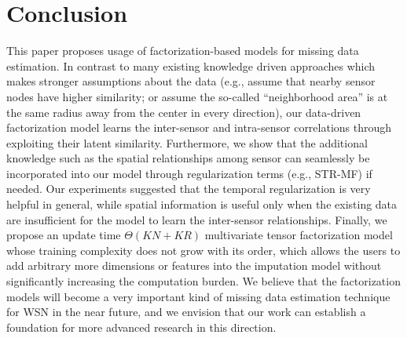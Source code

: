 \section{Conclusion}  \label{sec:conc}
This paper proposes usage of factorization-based models for missing data estimation.
In contrast to many existing knowledge driven approaches which makes stronger assumptions about the data (e.g., assume that nearby sensor nodes have higher similarity; or assume the so-called ``neighborhood area'' is at the same radius away from the center in every direction), our data-driven factorization model learns the inter-sensor and intra-sensor correlations through exploiting their latent similarity.
Furthermore, we show that the additional knowledge such as the spatial relationships among sensor can seamlessly be incorporated into our model through regularization terms (e.g., STR-MF) if needed.
Our experiments suggested that the temporal regularization is very helpful in general, while spatial information is useful only when the existing data are insufficient for the model to learn the inter-sensor relationships.
Finally, we propose an update time $\Theta(KN + KR)$ multivariate tensor factorization model whose training complexity does not grow with its order, which allows the users to add arbitrary more dimensions or features into the imputation model without significantly increasing the computation burden.
We believe that the factorization models will become a very important kind of missing data estimation technique for WSN in the near future, and we envision that our work can establish a foundation for more advanced research in this direction.
